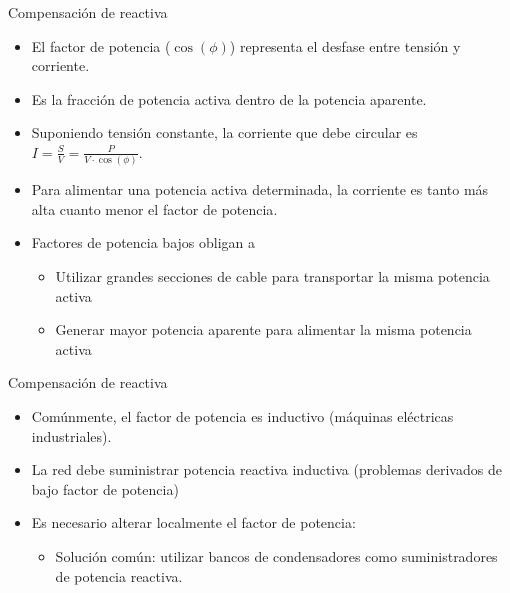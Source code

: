 \documentclass[xcolor={usenames,svgnames,dvipsnames}]{beamer}
\begin{document}
\begin{frame}[label={sec:orgc8f856d}]{Compensación de reactiva}
\begin{itemize}
\item El factor de potencia (\(\cos(\phi)\)) representa el desfase entre
tensión y corriente.

\item Es la fracción de potencia activa dentro de la potencia aparente.

\item Suponiendo tensión constante, la corriente que debe circular es
\(I=\frac{S}{V}=\frac{P}{V\cdot\cos(\phi)}\).

\item Para alimentar una potencia activa determinada, \alert{la corriente es
tanto más alta cuanto menor el factor de potencia}.

\item \alert{Factores de potencia bajos} obligan a

\begin{itemize}
\item Utilizar \alert{grandes secciones} de cable para transportar la misma
potencia activa

\item Generar \alert{mayor potencia aparente} para alimentar la misma potencia
activa
\end{itemize}
\end{itemize}
\end{frame}

\begin{frame}[label={sec:orgc950355}]{Compensación de reactiva}
\begin{itemize}
\item Comúnmente, el factor de potencia es \alert{inductivo} (máquinas eléctricas
industriales).

\item La red debe suministrar potencia reactiva inductiva (problemas
derivados de bajo factor de potencia)

\item Es necesario alterar localmente el factor de potencia:

\begin{itemize}
\item Solución común: utilizar \alert{bancos de condensadores} como
suministradores de potencia reactiva.
\end{itemize}
\end{itemize}
\end{frame}
\end{document}
